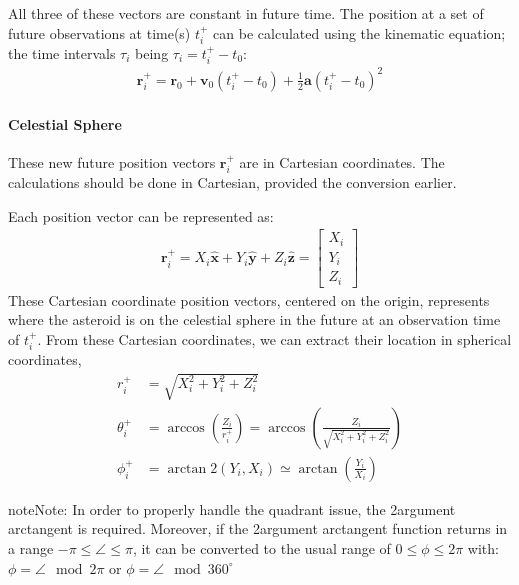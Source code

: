 \documentclass[letterpaper,11pt,english]{sphinxmanual}
\begin{document}
\sphinxAtStartPar
All three of these vectors are constant in future time. The position at a
set of future observations at time(s) \(t^+_i\) can be calculated using
the kinematic equation; the time intervals \(\tau_i\) being
\(\tau_i = t^+_i - t_0\):
\begin{equation*}
\begin{split}\mathbf{r}^+_i = \mathbf{r}_0 + \mathbf{v}_0 \left(t^+_i - t_0\right) + \frac{1}{2} \mathbf{a} \left(t^+_i - t_0\right)^2\end{split}
\end{equation*}

\paragraph{Celestial Sphere}
\label{\detokenize{technical/algorithms/spherical_kinematics:celestial-sphere}}
\sphinxAtStartPar
These new future position vectors \(\mathbf{r}^+_i\) are in Cartesian
coordinates. The calculations should be done in Cartesian, provided the
conversion earlier.

\sphinxAtStartPar
Each position vector can be represented as:
\begin{equation*}
\begin{split}\mathbf{r}^+_i = X_i \hat{\mathbf{x}} + Y_i \hat{\mathbf{y}} + Z_i \hat{\mathbf{z}} = \begin{bmatrix} X_i \\ Y_i \\ Z_i \end{bmatrix}\end{split}
\end{equation*}
\sphinxAtStartPar
These Cartesian coordinate position vectors, centered on the origin, represents
where the asteroid is on the celestial sphere in the future at an observation
time of \(t^+_i\). From these Cartesian coordinates, we can extract their
location in spherical coordinates,
\begin{equation*}
\begin{split}r^+_i &= \sqrt{X_i^2 + Y_i^2 + Z_i^2} \\
\theta^+_i &= \arccos\left(\frac{Z_i}{r^+_i}\right) = \arccos\left(\frac{Z_i}{\sqrt{X_i^2 + Y_i^2 + Z_i^2}}\right) \\
\phi^+_i &= \arctan\!2(Y_i, X_i) \simeq \arctan\left(\frac{Y_i}{X_i}\right)\end{split}
\end{equation*}
\begin{sphinxadmonition}{note}{Note:}
\sphinxAtStartPar
In order to properly handle the quadrant issue, the 2\sphinxhyphen{}argument arctangent is
required. Moreover, if the 2\sphinxhyphen{}argument arctangent function returns in a range
\(-\pi \leq \angle \leq \pi\), it can be converted to the usual range of
\(0 \leq \phi \leq 2\pi\) with: \(\phi = \angle \mod 2\pi\)
or \(\phi = \angle \mod 360^\circ\)
\end{sphinxadmonition}
\end{document}
